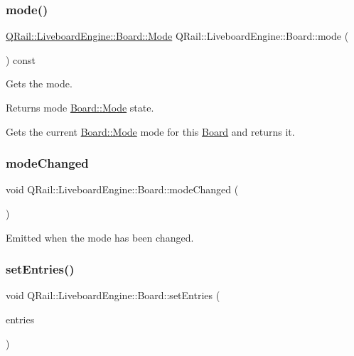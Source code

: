 \subsubsection{\texorpdfstring{mode()}{mode()}}
{\footnotesize\ttfamily \mbox{\hyperlink{classQRail_1_1LiveboardEngine_1_1Board_a0ab6d318f405895f62c6e98cb2d86c6e}{Q\+Rail\+::\+Liveboard\+Engine\+::\+Board\+::\+Mode}} Q\+Rail\+::\+Liveboard\+Engine\+::\+Board\+::mode (\begin{DoxyParamCaption}{ }\end{DoxyParamCaption}) const}



Gets the mode. 

\begin{DoxyReturn}{Returns}
mode \mbox{\hyperlink{classQRail_1_1LiveboardEngine_1_1Board_a0ab6d318f405895f62c6e98cb2d86c6e}{Board\+::\+Mode}} state.
\end{DoxyReturn}
Gets the current \mbox{\hyperlink{classQRail_1_1LiveboardEngine_1_1Board_a0ab6d318f405895f62c6e98cb2d86c6e}{Board\+::\+Mode}} mode for this \mbox{\hyperlink{classQRail_1_1LiveboardEngine_1_1Board}{Board}} and returns it. \mbox{\label{classQRail_1_1LiveboardEngine_1_1Board_a10e65fb6aa6c56428ba4d700e3b6a67d}} 
\subsubsection{\texorpdfstring{modeChanged}{modeChanged}}
{\footnotesize\ttfamily void Q\+Rail\+::\+Liveboard\+Engine\+::\+Board\+::mode\+Changed (\begin{DoxyParamCaption}{ }\end{DoxyParamCaption})\hspace{0.3cm}{\ttfamily [signal]}}



Emitted when the mode has been changed. 

\mbox{\label{classQRail_1_1LiveboardEngine_1_1Board_a48325ac92e049047391823d2ea55c0d7}} 
\subsubsection{\texorpdfstring{setEntries()}{setEntries()}}
{\footnotesize\ttfamily void Q\+Rail\+::\+Liveboard\+Engine\+::\+Board\+::set\+Entries (\begin{DoxyParamCaption}\item[{const Q\+List$<$ \mbox{\hyperlink{classQRail_1_1VehicleEngine_1_1Vehicle}{Q\+Rail\+::\+Vehicle\+Engine\+::\+Vehicle}} $\ast$ $>$ \&}]{entries }\end{DoxyParamCaption})}



